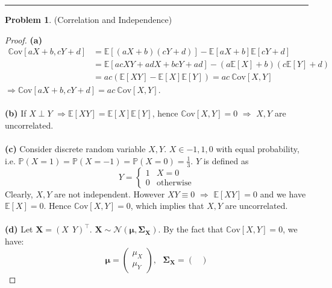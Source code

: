 \documentclass[a4paper, 10pt]{article}
\theoremstyle{definition}
\newtheorem{problem}{Problem}
\theoremstyle{hSol}
\begin{document}
\noindent\rule{16cm}{0.4pt}
\begin{problem} (Correlation and Independence)
\end{problem}
\begin{proof} \textbf{(a)}
\begin{equation}
	\begin{split}
		\mathrm{\mathbb{C}ov}\left[aX+b, cY+d\right] &= \mathbb{E}\left[(aX+b)(cY+d)\right] - \mathbb{E}\left[aX+b\right] \mathbb{E}\left[cY+d\right] \\
		&= \mathbb{E}\left[acXY + adX+bcY + ad\right] - (a \mathbb{E}\left[X\right] + b)(c \mathbb{E}\left[Y\right]+d) \\
		&= ac(\mathbb{E}\left[XY\right]-\mathbb{E}\left[X\right]\mathbb{E}\left[Y\right]) = ac~\mathrm{\mathbb{C}ov}\left[X,Y\right]
	\end{split}
\end{equation}
$\Rightarrow \mathrm{\mathbb{C}ov}\left[aX+b, cY+d\right] = ac~\mathrm{\mathbb{C}ov}\left[X,Y\right]$.\\
~\\
\textbf{(b)} If $X\perp Y$ $\Rightarrow \mathbb{E}\left[XY\right] = \mathbb{E}\left[X\right] \mathbb{E}\left[Y\right]$, hence $\mathrm{\mathbb{C}ov}\left[X,Y\right]=0$ $\Rightarrow$ $X,Y$ are uncorrelated.\\
~\\
\textbf{(c)} Consider discrete random variable $X,Y$. $X\in {-1,1,0}$ with equal probability, i.e. $\mathbb{P}\left(X=1\right)=\mathbb{P}\left(X=-1\right)=\mathbb{P}\left(X=0\right)=\frac{1}{3}$. $Y$ is defined as
$$
Y = \begin{cases}
1 & X=0\\
0 & \text{otherwise}
\end{cases}
$$
Clearly, $X,Y$ are not independent. However $XY\equiv 0$ $\Rightarrow$ $\mathbb{E}\left[XY\right] =0$ and we have $\mathbb{E}\left[X\right]=0$. Hence $\mathrm{\mathbb{C}ov}\left[X,Y\right] = 0$, which implies that $X,Y$ are uncorrelated. \\
~\\
\textbf{(d)} Let $\bm{X} = (X~~Y)^\top$. $\bm{X} \sim \mathcal{N}(\bm{\mu}, \bm{\Sigma}_{\bm{X}})$. By the fact that $\mathrm{\mathbb{C}ov}\left[X,Y\right]=0$, we have:
$$
\bm{\mu} = \begin{pmatrix}
	\mu_X \\
	\mu_Y
\end{pmatrix},~~~
\bm{\Sigma}_{\bm{X}} = \begin{pmatrix}

\end{pmatrix}$$
\end{proof}
\end{document}
